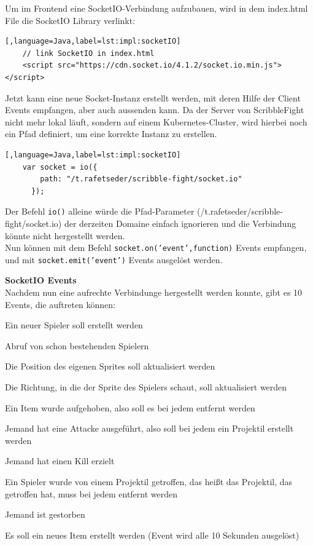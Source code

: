 Um im Frontend eine SocketIO-Verbindung aufzubauen, wird in dem index.html File die SocketIO Library verlinkt:
\begin{lstlisting}[,language=Java,label=lst:impl:socketIO]
    // link SocketIO in index.html
    <script src="https://cdn.socket.io/4.1.2/socket.io.min.js"></script>
\end{lstlisting}

Jetzt kann eine neue Socket-Instanz erstellt werden, mit deren Hilfe der Client Events empfangen, aber auch aussenden kann.
Da der Server von ScribbleFight nicht mehr lokal läuft, sondern auf einem Kubernetes-Cluster, wird hierbei noch ein Pfad definiert, um eine korrekte Instanz zu erstellen.

\begin{lstlisting}[,language=Java,label=lst:impl:socketIO]
    var socket = io({
        path: "/t.rafetseder/scribble-fight/socket.io"
      }); 
\end{lstlisting}

Der Befehl \texttt{io()} alleine würde die Pfad-Parameter (/t.rafetseder/scribble-fight/socket.io) der derzeiten Domaine einfach ignorieren und die Verbindung könnte nicht hergestellt werden.
\\
Nun können mit dem Befehl
\texttt{socket.on('event',function)} Events empfangen, und mit \texttt{socket.emit('event')} Events ausgelöst werden.

\textbf{SocketIO Events} \\
Nachdem nun eine aufrechte Verbindunge hergestellt werden konnte, gibt es 10 Events, die auftreten können:
\begin{compactitem}
    \item Ein neuer Spieler soll erstellt werden
    \item Abruf von schon bestehenden Spielern
    \item Die Position des eigenen Sprites soll aktualisiert werden
    \item Die Richtung, in die der Sprite des Spielers schaut, soll aktualisiert werden
    \item Ein Item wurde aufgehoben, also soll es bei jedem entfernt werden
    \item Jemand hat eine Attacke ausgeführt, also soll bei jedem ein Projektil erstellt werden
    \item Jemand hat einen Kill erzielt
    \item Ein Spieler wurde von einem Projektil getroffen, das heißt das Projektil, das getroffen hat, muss bei jedem entfernt werden
    \item Jemand ist gestorben
    \item Es soll ein neues Item erstellt werden (Event wird alle 10 Sekunden ausgelöst)
\end{compactitem}

